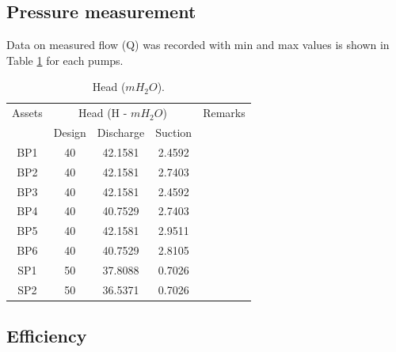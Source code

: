 \subsection{Pressure measurement} \label{ch04pressure}

Data on measured flow (Q) was recorded with min and max values is shown in Table \ref{ch04_tbl_flow02} for each pumps. %

\begin{table}[!h]
	\caption{Head ($mH_2O$).}
	\label{ch04_tbl_flow02}
	{\footnotesize
\begin{tabular}{c|c|c|c|l}
	\hline
	Assets & \multicolumn{3}{c|}{Head (H - $mH_2O$)} & Remarks \\ 
	\cline{2-4}
	& Design & Discharge & Suction &  \\ 
	\hline
	BP1 & 40 & 42.1581 & 2.4592 &  \\ 
	BP2 & 40 & 42.1581 & 2.7403 &  \\ 
	BP3 & 40 & 42.1581 & 2.4592 &  \\ 
	BP4 & 40 & 40.7529 & 2.7403 &  \\ 
	BP5 & 40 & 42.1581 & 2.9511 &  \\ 
	BP6 & 40 & 40.7529 & 2.8105 &  \\ 
	SP1 & 50 & 37.8088 & 0.7026 &  \\ 
	SP2 & 50 & 36.5371 & 0.7026 &  \\ 
	\hline
\end{tabular}
	}
\end{table}


\subsection{Efficiency}

